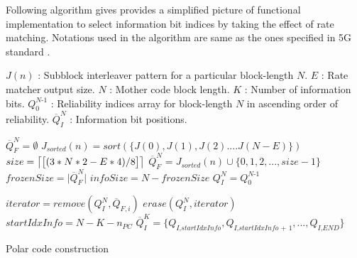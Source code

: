 Following algorithm gives provides a simplified picture of functional implementation to select information bit indices by taking the effect of rate matching. 
Notations used in the algorithm are same as the ones specified in 5G standard \cite{3gpp.38.212}.

$J(n)$ : Subblock interleaver pattern for a particular block-length $N$. \newline
$E$    : Rate matcher output size. \newline
$N$	   : Mother code block length. \newline
$K$	   : Number of information bits.\newline
$Q_{\textit{0}}^{\textit{N-1}}$ : Reliability indices array for block-length $N$ in ascending order of reliability. \newline
$\overline{Q}_{\textit{I}}^{\textit{N}}$ : Information bit positions. \newline


\IncMargin{1.5em}
\begin{algorithm}[h]
	$\overline{Q}_{\textit{F}}^{\textit{N}} = \emptyset$ \;
	 {
		 {   %
			$J_{sorted}(n) = sort(\{J(0),J(1),J(2)....J(N-E)\})$\;  \label{line:subblockRef1}
			 {
				$size = \ceil*{\big[(3*N*2 - E*4)/8\big]}$\;
				$\overline{Q}_{F}^{N} = J_{sorted}(n) \cup \{0,1,2, ... ,size-1\}$ \label{line:subblockRef2}
			} 	
		} 
	}
	$frozenSize = \big|\overline{Q}_{F}^{N}\big|$ \;
	$infoSize = N - frozenSize$ \;
	$Q_{\textit{I}}^{\textit{N}} = Q_{\textit{0}}^{\textit{N-1}}$ \;
	
	 {
		$iterator = remove(Q_{\textit{I}}^{\textit{N}},\overline{Q}_{F,i})$ \;
		$erase(Q_{\textit{I}}^{\textit{N}},iterator)$ \;
	}
	$startIdxInfo = N - K - n_{PC}$ \;
	$\overline{Q}_{\textit{I}}^{\textit{K}} = \{Q_{\textit{I,startIdxInfo}},Q_{\textit{I,startIdxInfo + 1}},...,Q_{\textit{I,END}}\}$
	\caption{Polar code construction}
	\label{algo:polarCodeConstuctionAlgo}
\end{algorithm}
\DecMargin{1.5em}


